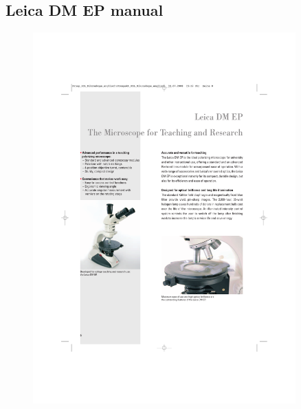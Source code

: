 \subsection{Leica DM EP manual}
\label{appendix_manual}

\begin{figure}[h!]
	\centering
	\includegraphics[width=0.9\textwidth]{afbeeldingen/manual_cut_1.pdf}
\end{figure}
\newpage	
